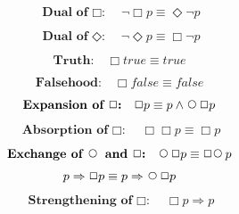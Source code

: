 \documentclass[fleqn, leqno]{article}
\newcommand{\impl}{\ensuremath{\Rightarrow}}        %
\newcommand{\Next}{\;\,\text{\raisebox{3.5pt}{\circle{6}}}}
\newcommand{\Event}{\Diamond}
\newcommand{\Always}{\Box}
\newcommand{\spacer}{\vspace{-30pt}}
\begin{document}
\spacer

\begin{equation}\label{E:dualAlways}
\textbf{Dual of $\Always$:}\quad \neg\Always p \equiv \Event\neg p
\end{equation}

\spacer

\begin{equation}\label{E:dualEvent}
\textbf{Dual of $\Event$:}\quad \neg\Event p \equiv \Always\neg p
\end{equation}

\spacer

\begin{equation}\label{E:alwaysTrue}
\textbf{Truth:}\quad \Always true \equiv true
\end{equation}

\spacer

\begin{equation}\label{E:alwaysFalse}
\textbf{Falsehood:}\quad \Always false \equiv false
\end{equation}

\spacer

\begin{equation}\label{E:expansionAlways}
\textbf{Expansion of $\Always$:}\quad \Always p \equiv p \land \Next\Always p
\end{equation}

\spacer

\begin{equation}\label{E:IdemAlways}
\textbf{Absorption of $\Always$:}\quad \Always\Always p \equiv \Always p
\end{equation}

\spacer

\begin{equation}\label{E:dNextAlways}
\textbf{Exchange of $\Next$ and $\Always$:}\quad \Next\Always p \equiv \Always\Next p
\end{equation}

\spacer

\begin{equation}\label{E:impNext}
p \impl \Always p \equiv p \impl \Next\Always p
\end{equation}

\spacer

\begin{equation}\label{E:impAlways}
\textbf{Strengthening of $\Always$:}\quad \Always p \impl p
\end{equation}

\spacer
\end{document}
